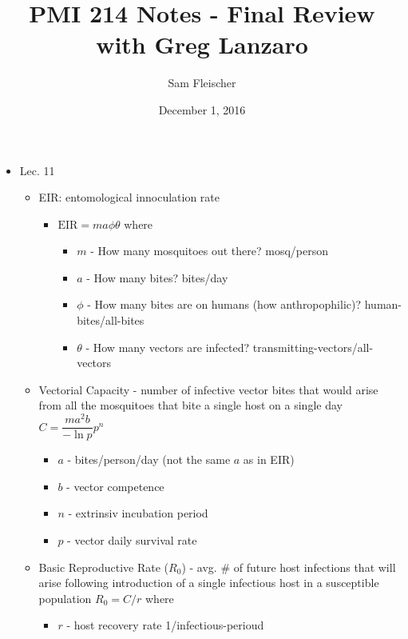 \documentclass{article}
\title{PMI 214 Notes - Final Review with Greg Lanzaro}
\author{Sam Fleischer}
\date{December 1, 2016}
\begin{document}
    \maketitle

    \begin{itemize}
        \item Lec. 11
        \begin{itemize}
            \item EIR: entomological innoculation rate
            \begin{itemize}
                \item $\text{EIR} = ma\phi\theta$ where
                \begin{itemize}
                     \item $m$ - How many mosquitoes out there? mosq/person
                     \item $a$ - How many bites? bites/day
                     \item $\phi$ - How many bites are on humans (how anthropophilic)? human-bites/all-bites 
                     \item $\theta$ - How many vectors are infected? transmitting-vectors/all-vectors
                \end{itemize}
            \end{itemize}
            \item Vectorial Capacity - number of infective vector bites that would arise from all the mosquitoes that bite a single host on a single day $C = \dfrac{ma^2b}{-\ln p}p^n$
            \begin{itemize}
                \item $a$ - bites/person/day (not the same $a$ as in EIR)
                \item $b$ - vector competence
                \item $n$ - extrinsiv incubation period
                \item $p$ - vector daily survival rate
            \end{itemize}
            \item Basic Reproductive Rate ($R_0$) - avg. \# of future host infections that will arise following introduction of a single infectious host in a susceptible population $R_0 = C/r$ where
            \begin{itemize}
                \item $r$ - host recovery rate 1/infectious-perioud
            \end{itemize}

\end{itemize}
\end{itemize}
\end{document}
